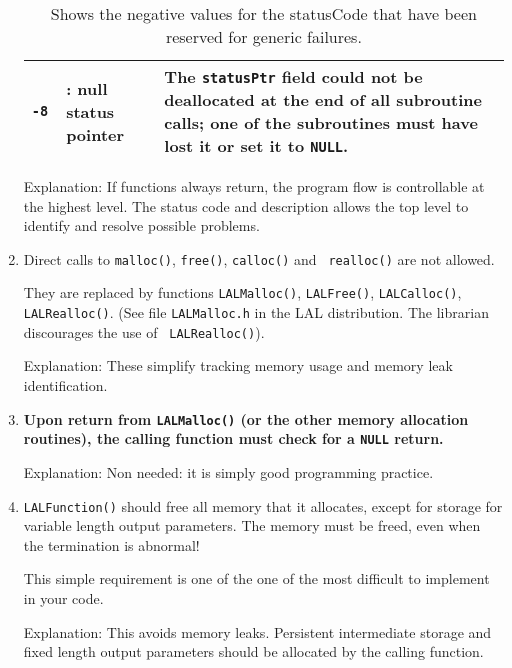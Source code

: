 \documentclass[]{ligodcc}
\renewcommand{\texttt}[1]{{\ttfamily\color{blue}#1}}
\begin{document}
\begin{enumerate}
\begin{table}
\begin{center}
\begin{tabular}{|cp{4.2cm}p{6.5cm}|}
\tt -8 & \vspace{-1.4ex}{\tt DETATCHSTATUSPTR}: null status pointer &
The {\tt statusPtr} field could not be deallocated at the end of all
subroutine calls; one of the subroutines must have lost it or set it
to {\tt NULL}. \\
\hline
\end{tabular}
\caption[Reserved negative status codes]{Shows the negative values for the {\texttt {statusCode}} that have been
reserved for generic failures.}
\label{statusCode}
\end{center}
\end{table}


Explanation: If functions always return, the program flow is
controllable at the highest level. The status code and description
allows the top level to identify and resolve possible problems. 

\item
Direct calls to {\tt malloc()}, {\tt free()}, {\tt calloc()} and {\tt
realloc()} are not allowed.

They are replaced by functions {\tt LALMalloc()}, {\tt LALFree()},
{\tt LALCalloc()}, {\tt LALRealloc()}. (See file {\tt LALMalloc.h} in
the LAL distribution. The librarian discourages the use of {\tt
LALRealloc()}).

Explanation: These simplify tracking memory usage and memory leak
identification.

\item
{\bf Upon return from {\tt LALMalloc()} (or the other memory allocation
routines), the calling function must check for a {\tt NULL} return.}

Explanation: Non needed: it is simply good programming practice.

\item
{\tt LALFunction()} should free all memory that it allocates, except
for storage for variable length output parameters.
The memory must be freed, even when the termination is abnormal!

This simple requirement is one of the one of the most difficult to 
implement in your code.

Explanation: This avoids memory leaks. Persistent intermediate storage
and fixed length output parameters should be allocated by the calling
function.


\end{enumerate}
\end{document}
